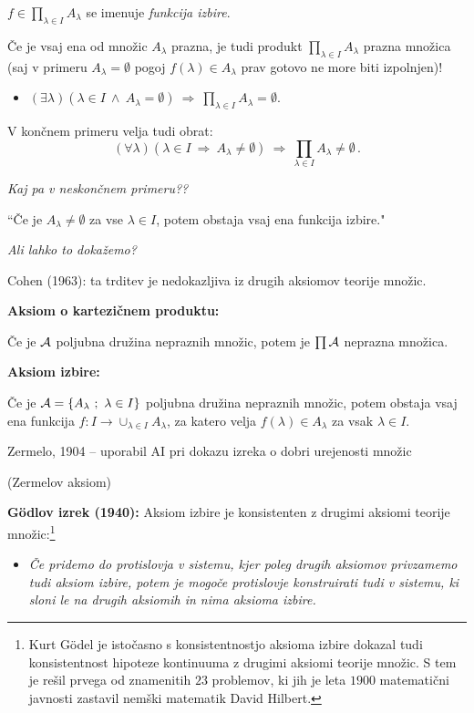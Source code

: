 \documentclass[11pt,paper=b5,footinclude,headinclude]{scrbook} %
\def\inn {{~\wedge~}}
\def\sledi {{~\Rightarrow~}}
\begin{document}
$f\in \prod_{\lambda\in I}A_\lambda$ se imenuje {\em funkcija izbire}.

Če je vsaj ena od množic $A_\lambda$ prazna, je tudi produkt $\prod_{\lambda\in I}A_\lambda$ prazna množica (saj v primeru $A_\lambda = \emptyset$ pogoj $f(\lambda) \in A_\lambda$ prav gotovo ne more biti izpolnjen)!
\begin{itemize}
  \item $(\exists \lambda)(\lambda\in I\inn A_\lambda = \emptyset)\sledi \prod_{\lambda\in I}A_\lambda=\emptyset$.
\end{itemize}

V končnem primeru velja tudi obrat:
$$(\forall \lambda)(\lambda\in I\sledi A_\lambda\neq\emptyset)\sledi
      \prod_{\lambda\in I}A_\lambda\neq\emptyset\,.$$

{\em Kaj pa v neskončnem primeru??}

``Če je $A_\lambda\neq \emptyset$ za vse $\lambda\in I$, potem obstaja vsaj ena funkcija izbire."~

{\em Ali lahko to dokažemo?}

Cohen (1963): ta trditev je nedokazljiva iz drugih aksiomov teorije množic.

\bigskip
\textbf{Aksiom o kartezičnem produktu:}

Če je ${\cal A}$ poljubna družina nepraznih množic, potem je $\prod {\cal A}$ neprazna množica.

\bigskip
\textbf{Aksiom izbire:}

Če je ${\cal A} = \{A_\lambda~;~\lambda\in I\}$ poljubna družina nepraznih množic,
potem obstaja vsaj ena funkcija $f:I\to \cup_{\lambda \in I}A_\lambda$, za katero velja
$f(\lambda)\in A_\lambda$ za vsak $\lambda\in I$.

Zermelo, 1904 -- uporabil AI pri dokazu izreka o dobri urejenosti množic

(Zermelov aksiom)


\bigskip

\textbf{G\"odlov izrek (1940):} Aksiom izbire je konsistenten z drugimi aksiomi teorije množic:\footnote{Kurt G\"odel je istočasno s konsistentnostjo aksioma izbire dokazal tudi konsistentnost hipoteze kontinuuma z drugimi aksiomi teorije množic. S tem je rešil prvega od znamenitih $23$ problemov, ki jih je leta $1900$ matematični javnosti zastavil
nemški matematik David Hilbert.}
\begin{itemize}
  \item \emph{ Če pridemo do protislovja v sistemu, kjer poleg drugih aksiomov privzamemo tudi aksiom izbire, potem je mogoče protislovje konstruirati tudi v sistemu, ki sloni le na drugih aksiomih in nima aksioma izbire.}
\end{itemize}
\end{document}
